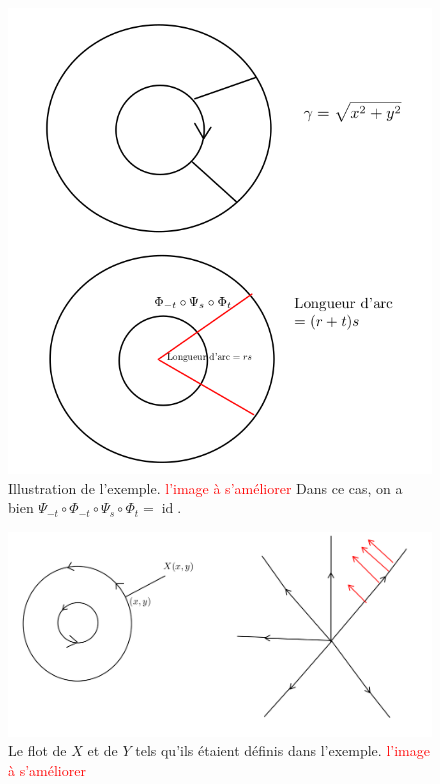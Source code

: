 \documentclass[french]{article}
\theoremstyle{definition}
\begin{document}
\begin{figure}[h!]
  \centering
  \includegraphics[scale=0.3]{figures/exemple_gamma_psi_phi.png}
  \caption{Illustration de l'exemple. \textcolor{red}{l'image \`a s'am\'eliorer} Dans ce cas, on a bien \(\Psi _{-t} \circ \Phi _{-t}\circ \Psi_s \circ \Phi_t = \operatorname{id}\).}
  \label{exemple_gamma_psi_phi}
\end{figure}

\begin{figure}[H]
  \centering
  \includegraphics[scale=0.3]{figures/flotXY.png}
  \caption{Le flot de \(X\) et de \(Y\) tels qu'ils étaient définis dans l'exemple. \textcolor{red}{l'image \`a s'am\'eliorer}}
  \label{flotXY}
\end{figure}
\end{document}
